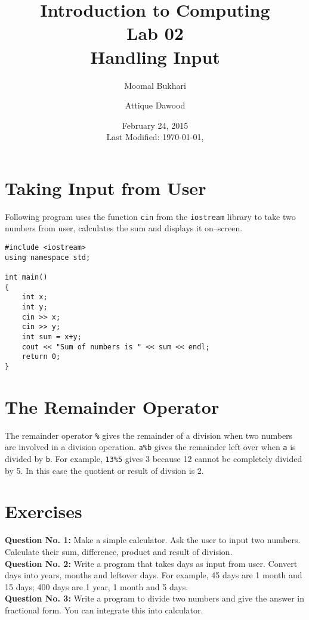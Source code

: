 \documentclass[12pt,a4paper]{article}
\title{Introduction to Computing\\Lab 02\\Handling Input}
\author{Moomal Bukhari\and Attique Dawood}
\date{February 24, 2015\\[0.2cm] Last Modified: \today, \currenttime}
\begin{document}
\maketitle
\section{Taking Input from User}
Following program uses the function \verb|cin| from the \verb|iostream| library to take two numbers from user, calculates the sum and displays it on--screen.
\begin{lstlisting}[caption={Input}]
#include <iostream> 
using namespace std; 

int main() 
{
	int x;
	int y;
	cin >> x;
	cin >> y;
	int sum = x+y;
	cout << "Sum of numbers is " << sum << endl; 
	return 0; 
}
\end{lstlisting}
\section{The Remainder Operator}
The remainder operator \verb|%| gives the remainder of a division when two numbers are involved in a division operation. \verb|a%b| gives the remainder left over when \verb|a| is divided by \verb|b|. For example, \verb|13%5| gives 3 because 12 cannot be completely divided by 5. In this case the quotient or result of divsion is 2.
\section{Exercises}
\noindent\textbf{Question No. 1:} Make a simple calculator. Ask the user to input two numbers. Calculate their sum, difference, product and result of division.\\[0.2cm]
\noindent\textbf{Question No. 2:} Write a program that takes days as input from user. Convert days into years, months and leftover days. For example, 45 days are 1 month and 15 days; 400 days are 1 year, 1 month and 5 days.\\[0.2cm]
\noindent\textbf{Question No. 3:} Write a program to divide two numbers and give the answer in fractional form. You can integrate this into calculator.
\end{document}
